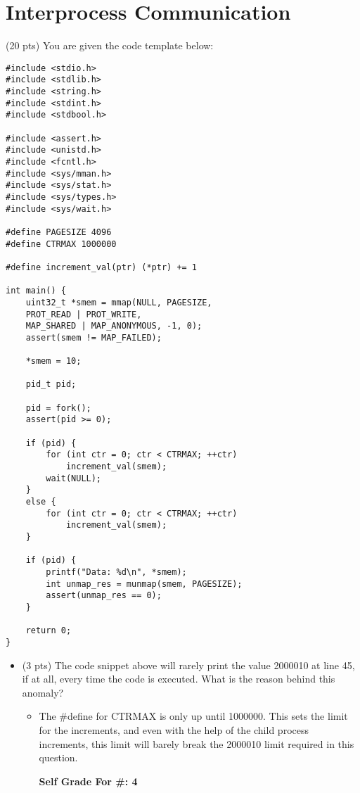 \documentclass[conference]{IEEEtran}
\begin{document}
\section{Interprocess Communication}
(20 pts) You are given the code template below:
\begin{lstlisting}
#include <stdio.h>
#include <stdlib.h>
#include <string.h>
#include <stdint.h>
#include <stdbool.h>

#include <assert.h>
#include <unistd.h>
#include <fcntl.h>
#include <sys/mman.h>
#include <sys/stat.h>
#include <sys/types.h>
#include <sys/wait.h>

#define PAGESIZE 4096
#define CTRMAX 1000000

#define increment_val(ptr) (*ptr) += 1

int main() {
	uint32_t *smem = mmap(NULL, PAGESIZE,
	PROT_READ | PROT_WRITE,
	MAP_SHARED | MAP_ANONYMOUS, -1, 0);
	assert(smem != MAP_FAILED);
	
	*smem = 10;
	
	pid_t pid;
	
	pid = fork();
	assert(pid >= 0);
	
	if (pid) {
		for (int ctr = 0; ctr < CTRMAX; ++ctr)
			increment_val(smem);
		wait(NULL);
	} 
	else {
		for (int ctr = 0; ctr < CTRMAX; ++ctr)
			increment_val(smem);
	}
	
	if (pid) {
		printf("Data: %d\n", *smem);
		int unmap_res = munmap(smem, PAGESIZE);
		assert(unmap_res == 0);
	}
	
	return 0;
}
\end{lstlisting}

\begin{itemize}
\item (3 pts) The code snippet above will rarely print the value 2000010 at line 45, if at all, every time the code is executed. What is the reason behind this anomaly?
\begin{itemize} 
	\item The \#define for CTRMAX is only up until 1000000. This sets the limit for the increments, and even with the help of the child process increments, this limit will barely break the 2000010 limit required in this question.
	
	\begin{center}
		\textbf{Self Grade For \#: 4}
	\end{center}
\end{itemize}
\end{itemize}
\end{document}
